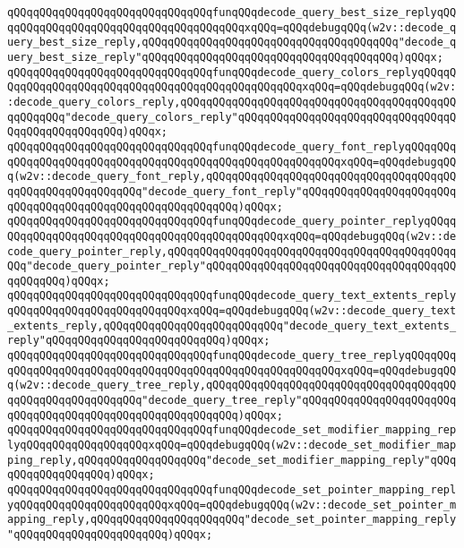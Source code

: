 \verb|qQQqqQQqqQQqqQQqqQQqqQQqqQQqqQQqfunqQQqdecode_query_best_size_replyqQQqqQQqqQQqqQQqqQQqqQQqqQQqqQQqqQQqqQQqxqQQq=qQQqdebugqQQq(w2v::decode_query_best_size_reply,qQQqqQQqqQQqqQQqqQQqqQQqqQQqqQQqqQQqqQQq"decode_query_best_size_reply"qQQqqQQqqQQqqQQqqQQqqQQqqQQqqQQqqQQqqQQq)qQQqx;|\newline
\verb|qQQqqQQqqQQqqQQqqQQqqQQqqQQqqQQqfunqQQqdecode_query_colors_replyqQQqqQQqqQQqqQQqqQQqqQQqqQQqqQQqqQQqqQQqqQQqqQQqqQQqxqQQq=qQQqdebugqQQq(w2v::decode_query_colors_reply,qQQqqQQqqQQqqQQqqQQqqQQqqQQqqQQqqQQqqQQqqQQqqQQqqQQq"decode_query_colors_reply"qQQqqQQqqQQqqQQqqQQqqQQqqQQqqQQqqQQqqQQqqQQqqQQqqQQq)qQQqx;|\newline
\verb|qQQqqQQqqQQqqQQqqQQqqQQqqQQqqQQqfunqQQqdecode_query_font_replyqQQqqQQqqQQqqQQqqQQqqQQqqQQqqQQqqQQqqQQqqQQqqQQqqQQqqQQqqQQqxqQQq=qQQqdebugqQQq(w2v::decode_query_font_reply,qQQqqQQqqQQqqQQqqQQqqQQqqQQqqQQqqQQqqQQqqQQqqQQqqQQqqQQqqQQq"decode_query_font_reply"qQQqqQQqqQQqqQQqqQQqqQQqqQQqqQQqqQQqqQQqqQQqqQQqqQQqqQQqqQQq)qQQqx;|\newline
\verb|qQQqqQQqqQQqqQQqqQQqqQQqqQQqqQQqfunqQQqdecode_query_pointer_replyqQQqqQQqqQQqqQQqqQQqqQQqqQQqqQQqqQQqqQQqqQQqqQQqxqQQq=qQQqdebugqQQq(w2v::decode_query_pointer_reply,qQQqqQQqqQQqqQQqqQQqqQQqqQQqqQQqqQQqqQQqqQQqqQQq"decode_query_pointer_reply"qQQqqQQqqQQqqQQqqQQqqQQqqQQqqQQqqQQqqQQqqQQqqQQq)qQQqx;|\newline
\verb|qQQqqQQqqQQqqQQqqQQqqQQqqQQqqQQqfunqQQqdecode_query_text_extents_replyqQQqqQQqqQQqqQQqqQQqqQQqqQQqxqQQq=qQQqdebugqQQq(w2v::decode_query_text_extents_reply,qQQqqQQqqQQqqQQqqQQqqQQqqQQq"decode_query_text_extents_reply"qQQqqQQqqQQqqQQqqQQqqQQqqQQq)qQQqx;|\newline
\verb|qQQqqQQqqQQqqQQqqQQqqQQqqQQqqQQqfunqQQqdecode_query_tree_replyqQQqqQQqqQQqqQQqqQQqqQQqqQQqqQQqqQQqqQQqqQQqqQQqqQQqqQQqqQQqxqQQq=qQQqdebugqQQq(w2v::decode_query_tree_reply,qQQqqQQqqQQqqQQqqQQqqQQqqQQqqQQqqQQqqQQqqQQqqQQqqQQqqQQqqQQq"decode_query_tree_reply"qQQqqQQqqQQqqQQqqQQqqQQqqQQqqQQqqQQqqQQqqQQqqQQqqQQqqQQqqQQq)qQQqx;|\newline
\verb|qQQqqQQqqQQqqQQqqQQqqQQqqQQqqQQqfunqQQqdecode_set_modifier_mapping_replyqQQqqQQqqQQqqQQqqQQqxqQQq=qQQqdebugqQQq(w2v::decode_set_modifier_mapping_reply,qQQqqQQqqQQqqQQqqQQq"decode_set_modifier_mapping_reply"qQQqqQQqqQQqqQQqqQQq)qQQqx;|\newline
\verb|qQQqqQQqqQQqqQQqqQQqqQQqqQQqqQQqfunqQQqdecode_set_pointer_mapping_replyqQQqqQQqqQQqqQQqqQQqqQQqxqQQq=qQQqdebugqQQq(w2v::decode_set_pointer_mapping_reply,qQQqqQQqqQQqqQQqqQQqqQQq"decode_set_pointer_mapping_reply"qQQqqQQqqQQqqQQqqQQqqQQq)qQQqx;|\newline
